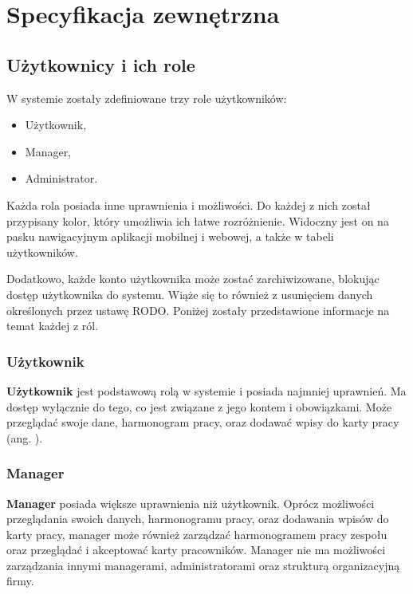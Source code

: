 \chapter{Specyfikacja zewnętrzna}
\label{ch:04}

\section{Użytkownicy i ich role}

W systemie zostały zdefiniowane trzy role użytkowników:

\begin{itemize}
    \item Użytkownik,
    \item Manager,
    \item Administrator.
\end{itemize}

Każda rola posiada inne uprawnienia i możliwości. Do każdej z nich został przypisany kolor, który umożliwia ich łatwe rozróżnienie. Widoczny jest on na pasku nawigacyjnym aplikacji mobilnej i webowej, a także w tabeli użytkowników.

Dodatkowo, każde konto użytkownika może zostać zarchiwizowane, blokując dostęp użytkownika do systemu. Wiąże się to również z usunięciem danych określonych przez ustawę RODO. Poniżej zostały przedstawione informacje na temat każdej z ról.


\subsection{Użytkownik}

\textbf{Użytkownik} jest podstawową rolą w systemie i posiada najmniej uprawnień. Ma dostęp wyłącznie do tego, co jest związane z jego kontem i obowiązkami. Może przeglądać swoje dane, harmonogram pracy, oraz dodawać wpisy do karty pracy (ang. ).

\subsection{Manager}

\textbf{Manager} posiada większe uprawnienia niż użytkownik. Oprócz możliwości przeglądania swoich danych, harmonogramu pracy, oraz dodawania wpisów do karty pracy, manager może również zarządzać harmonogramem pracy zespołu oraz przeglądać i akceptować karty pracowników. Manager nie ma możliwości zarządzania innymi managerami, administratorami oraz strukturą organizacyjną firmy.

